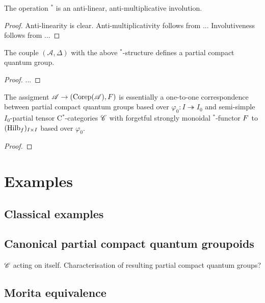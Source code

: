 \begin{Lem} The operation $^*$ is an anti-linear, anti-multiplicative involution.
\end{Lem}

\begin{proof} Anti-linearity is clear. Anti-multiplicativity follows from ... Involutiveness follows from ...

\end{proof}

\begin{Prop} The couple $(\mathscr{A},\Delta)$ with the above $^*$-structure defines a partial compact quantum group.
\end{Prop}
\begin{proof} ...

\end{proof} 

\begin{Theorem} \label{TheoTKPCQG} The assigment $\mathscr{A}\rightarrow (\mathrm{Corep}(\mathscr{A}),F)$ is essentially a one-to-one correspondence between partial compact quantum groups based over $\varphi_0:I\twoheadrightarrow I_0$ and semi-simple $I_0$-partial tensor C$^*$-categories $\mathscr{C}$ with forgetful strongly monoidal $^*$-functor $F$ to $(\mathrm{Hilb}_f)_{I\times I}$ based over $\varphi_0$.
\end{Theorem} 

\begin{proof}

\end{proof}

\section{Examples}

\subsection{Classical examples}

\subsection{Canonical partial compact quantum groupoids}

$\mathscr{C}$ acting on itself. Characterisation of resulting partial compact quantum groups? 

\subsection{Morita equivalence}

